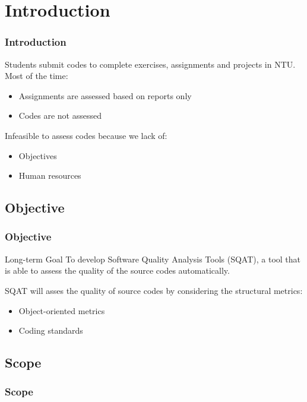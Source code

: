 \section{Introduction}
\begin{frame}
\frametitle{Introduction}

Students submit codes to complete exercises, assignments and projects in NTU. Most of the time:

\begin{itemize}
  \item Assignments are assessed based on reports only
  \item Codes are not assessed
\end{itemize}

Infeasible to assess codes because we lack of:

\begin{itemize}
  \item Objectives
  \item Human resources
\end{itemize}
\end{frame}

\subsection{Objective}
\begin{frame}
\frametitle{Objective}

\begin{block}{Long-term Goal}
To develop Software Quality Analysis Tools (SQAT), a tool that is able to assess the quality of the source codes automatically.
\end{block}

SQAT will asses the quality of source codes by considering the structural metrics:

\begin{itemize}
  \item Object-oriented metrics
  \item Coding standards
\end{itemize}
\end{frame}

\subsection{Scope}
\begin{frame}
\frametitle{Scope}

\end{frame}